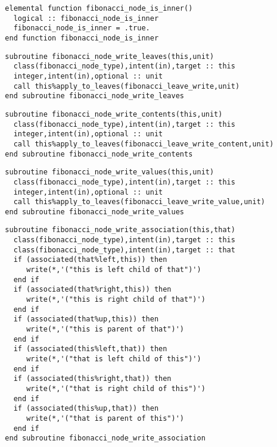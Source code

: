 \begin{Verbatim}
  elemental function fibonacci_node_is_inner()
    logical :: fibonacci_node_is_inner
    fibonacci_node_is_inner = .true.
  end function fibonacci_node_is_inner
\end{Verbatim}

\begin{Verbatim}
  subroutine fibonacci_node_write_leaves(this,unit)
    class(fibonacci_node_type),intent(in),target :: this
    integer,intent(in),optional :: unit
    call this%apply_to_leaves(fibonacci_leave_write,unit)
  end subroutine fibonacci_node_write_leaves
\end{Verbatim}

\begin{Verbatim}
  subroutine fibonacci_node_write_contents(this,unit)
    class(fibonacci_node_type),intent(in),target :: this
    integer,intent(in),optional :: unit
    call this%apply_to_leaves(fibonacci_leave_write_content,unit)
  end subroutine fibonacci_node_write_contents
\end{Verbatim}

\begin{Verbatim}
  subroutine fibonacci_node_write_values(this,unit)
    class(fibonacci_node_type),intent(in),target :: this
    integer,intent(in),optional :: unit
    call this%apply_to_leaves(fibonacci_leave_write_value,unit)
  end subroutine fibonacci_node_write_values
\end{Verbatim}

\begin{Verbatim}
  subroutine fibonacci_node_write_association(this,that)
    class(fibonacci_node_type),intent(in),target :: this
    class(fibonacci_node_type),intent(in),target :: that
    if (associated(that%left,this)) then
       write(*,'("this is left child of that")')
    end if
    if (associated(that%right,this)) then
       write(*,'("this is right child of that")')
    end if
    if (associated(that%up,this)) then
       write(*,'("this is parent of that")')
    end if    
    if (associated(this%left,that)) then
       write(*,'("that is left child of this")')
    end if
    if (associated(this%right,that)) then
       write(*,'("that is right child of this")')
    end if
    if (associated(this%up,that)) then
       write(*,'("that is parent of this")')
    end if
  end subroutine fibonacci_node_write_association
\end{Verbatim}
  
